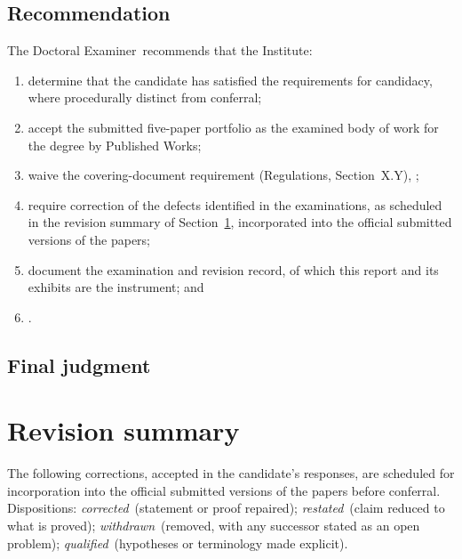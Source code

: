 \documentclass[11pt]{article}
\newcommand{\degreeRoute}{by Published Works}
\newcommand{\regsWaiverSection}{Section~X.Y} %
\newcommand{\examinerRole}{Doctoral Examiner}
\newcommand{\numPapers}{five}
\newif\ifdraftnotes     \draftnotesfalse     %
\newcommand{\corrected}{\emph{corrected}}
\newcommand{\restated}{\emph{restated}}
\newcommand{\withdrawn}{\emph{withdrawn}}
\newcommand{\qualified}{\emph{qualified}}
\newcommand{\note}[1]{\ifdraftnotes\textcolor{red}{\small[\,#1\,]}\fi}
\begin{document}
\subsection{Recommendation}

The \examinerRole\ recommends that the Institute:

\begin{enumerate}[label=(\arabic*),leftmargin=2.5em]
\item determine that the candidate has satisfied the requirements for
      candidacy, where procedurally distinct from conferral;
\item accept the submitted \numPapers-paper portfolio as the examined body of
      work for the degree \degreeRoute;
\item \note{optional:} waive the covering-document requirement
      (Regulations, \regsWaiverSection), \note{with grounds};
\item require correction of the defects identified in the examinations, as
      scheduled in the revision summary of Section~\ref{sec:revisions},
      incorporated into the official submitted versions of the papers;
\item document the examination and revision record, of which this report and
      its exhibits are the instrument; and
\item \note{confer the degree once the corrected portfolio satisfies the
      published requirements / alternative outcome}.
\end{enumerate}

\subsection{Final judgment}

\note{One paragraph: the portfolio against the published requirement; the
research independence demonstrated; the status of the deficiencies; what
remains before conferral.}

\section{Revision summary}\label{sec:revisions}

The following corrections, accepted in the candidate's responses, are scheduled
for incorporation into the official submitted versions of the papers before
conferral. Dispositions: \corrected\ (statement or proof repaired); \restated\
(claim reduced to what is proved); \withdrawn\ (removed, with any successor
stated as an open problem); \qualified\ (hypotheses or terminology made
explicit).
\end{document}
